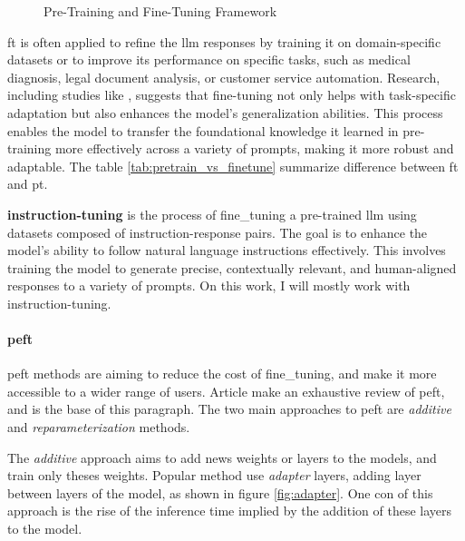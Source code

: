 \begin{figure}[h]
    \centering
    
    \caption{Pre-Training and Fine-Tuning Framework}
    \label{fig:pretrain_finetune}
\end{figure}

\Gls{ft} is often applied to refine the \acrshort{llm} responses by training it on domain-specific datasets or to improve its performance on specific tasks, such as medical diagnosis, legal document analysis, or customer service automation. Research, including studies like \cite{wei_finetuned_2022}, suggests that fine-tuning not only helps with task-specific adaptation but also enhances the model's generalization abilities. This process enables the model to transfer the foundational knowledge it learned in pre-training more effectively across a variety of prompts, making it more robust and adaptable. The table \ref{tab:pretrain_vs_finetune} summarize difference between \gls{ft} and \gls{pt}.



\textbf{\Gls{instruction-tuning}} is the process of \gls{fine_tuning} a pre-trained \acrshort{llm} using datasets composed of instruction-response pairs. The goal is to enhance the model's ability to follow natural language instructions effectively. This involves training the model to generate precise, contextually relevant, and human-aligned responses to a variety of prompts. On this work, I will mostly work with \gls{instruction-tuning}.

\paragraph{\acrfull{peft}}

\acrshort{peft} methods are aiming to reduce the cost of \gls{fine_tuning}, and make it more accessible to a wider range of users. Article \cite{han_parameter-efficient_2024} make an exhaustive review of \acrshort{peft}, and is the base of this paragraph. The two main approaches to \acrshort{peft} are \textit{additive} and \textit{reparameterization} methods.

The \textit{additive} approach aims to add news weights or layers to the models, and train only theses weights. Popular method  use \textit{adapter} layers, adding layer between layers of the model, as shown in figure \ref{fig:adapter}. One con of this approach is the rise of the inference time implied by the addition of these layers to the model.



